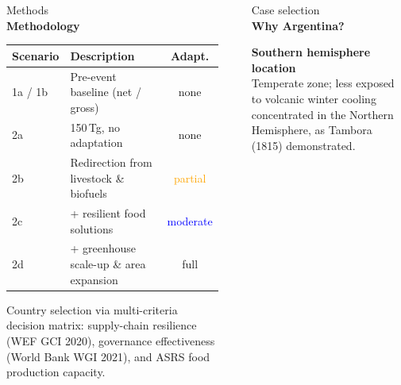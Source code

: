 \documentclass[final]{beamer}
\newlength{\sepwidth}
\newlength{\colwidth}
\newlength{\widecolwidth}
\newenvironment{labelblock}[2]{%
  \begin{block}{%
      {\small\color{structure.fg!70!bg}#1}%
      \\[2pt]                                  %
      {\large\bfseries#2}%
      }%
      }{%
  \end{block}%
  }
\newcommand{\separatorcolumn}{\begin{column}{\sepwidth}\end{column}}
\begin{document}
\begin{frame}[t]
\begin{columns}[t]
\begin{column}{\widecolwidth}
\begin{labelblock}{Methods}{Methodology}
\begin{minipage}[t]{0.48\linewidth}
          \vspace{4pt}
          {\small
          \begin{tabular}{@{} l p{\dimexpr\linewidth-6.5cm\relax} c @{}}
            \toprule
            Scenario & Description & Adapt. \\
            \midrule
            1a / 1b & Pre-event baseline (net / gross) & \textcolor{red!70!black}{\textsf{none}} \\
            2a      & 150\,Tg, no adaptation               & \textcolor{red!70!black}{\textsf{none}} \\
            2b      & Redirection from livestock \& biofuels & \textcolor{orange}{\textsf{partial}} \\
            2c      & + resilient food solutions            & \textcolor{blue}{\textsf{moderate}} \\
            2d      & + greenhouse scale-up \& area expansion & \textcolor{green!50!black}{\textsf{full}} \\
            \bottomrule
          \end{tabular}
          }

          \vspace{6pt}
          \small
          Country selection via multi-criteria decision matrix: supply-chain resilience
          (WEF GCI 2020), governance effectiveness (World Bank WGI 2021), and ASRS food
          production capacity.
        \end{minipage}
      \end{labelblock}

    \end{column}

    \separatorcolumn


    \begin{column}{\colwidth}
      \begin{labelblock}{Case selection}{Why Argentina?}
        \begin{minipage}[t]{0.48\linewidth}
          \raggedright
          {\footnotesize\bfseries\textcolor{tealdark}{Southern hemisphere location}}\\
          {\scriptsize Temperate zone; less exposed to volcanic winter cooling concentrated in the
          Northern Hemisphere, as Tambora (1815) demonstrated.}
          \vspace{5pt}


\end{minipage}
\end{labelblock}
\end{column}
\end{columns}
\end{frame}
\end{document}
